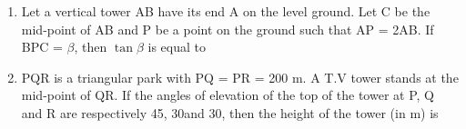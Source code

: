 \documentclass[journal,12pt,twocolumn]{IEEEtran}
\begin{document}
\begin{enumerate}
 \begin{itemize}
 \end{itemize}
 \item Let a vertical tower AB have its end A on the level ground. Let C be the mid-point of AB and P be a point on the ground such that AP = 2AB. If \angle BPC = $\beta$, then $\tan\beta$ is equal to
 \begin{itemize}
 \end{itemize}
 \item PQR is a triangular park with PQ = PR = 200 m. A T.V tower stands at the mid-point of QR. If the angles of elevation of the top of the tower at P, Q and R are respectively 45\degree, 30\degree and 30\degree, then the height of the tower (in m) is
 \begin{itemize}
 \end{itemize}
 \end{enumerate}
\end{document}
